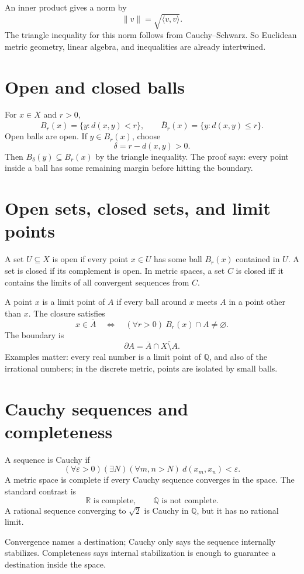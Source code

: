 An inner product gives a norm by
\[
  \|v\|=\sqrt{\langle v,v\rangle}.
\]
The triangle inequality for this norm follows from Cauchy--Schwarz.  So Euclidean metric geometry, linear algebra, and inequalities are already intertwined.

\section{Open and closed balls}

For $x\in X$ and $r>0$,
\[
  B_r(x)=\{y:d(x,y)<r\},\qquad
  \overline B_r(x)=\{y:d(x,y)\le r\}.
\]
Open balls are open.  If $y\in B_r(x)$, choose
\[
  \delta=r-d(x,y)>0.
\]
Then $B_\delta(y)\subseteq B_r(x)$ by the triangle inequality.  The proof says: every point inside a ball has some remaining margin before hitting the boundary.

\section{Open sets, closed sets, and limit points}

A set $U\subseteq X$ is open if every point $x\in U$ has some ball $B_r(x)$ contained in $U$.  A set is closed if its complement is open.  In metric spaces, a set $C$ is closed iff it contains the limits of all convergent sequences from $C$.

A point $x$ is a limit point of $A$ if every ball around $x$ meets $A$ in a point other than $x$.  The closure satisfies
\[
  x\in \overline A
  \quad\Longleftrightarrow\quad
  (\forall r>0)\ B_r(x)\cap A\ne\varnothing.
\]
The boundary is
\[
  \partial A=\overline A\cap \overline{X\setminus A}.
\]
Examples matter: every real number is a limit point of $\mathbb Q$, and also of the irrational numbers; in the discrete metric, points are isolated by small balls.

\section{Cauchy sequences and completeness}

A sequence is Cauchy if
\[
  (\forall \varepsilon>0)(\exists N)(\forall m,n>N)\ d(x_m,x_n)<\varepsilon.
\]
A metric space is complete if every Cauchy sequence converges in the space.  The standard contrast is
\[
  \mathbb R \text{ is complete},\qquad \mathbb Q \text{ is not complete}.
\]
A rational sequence converging to $\sqrt2$ is Cauchy in $\mathbb Q$, but it has no rational limit.

Convergence names a destination; Cauchy only says the sequence internally stabilizes.  Completeness says internal stabilization is enough to guarantee a destination inside the space.

